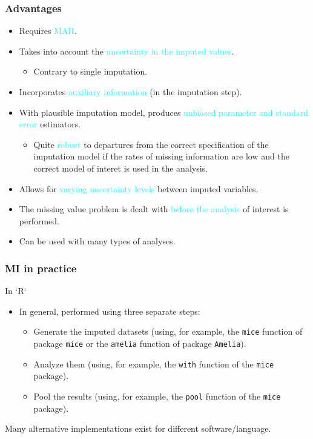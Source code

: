 \documentclass{beamer}
\begin{document}
\begin{frame}
\frametitle{Advantages}

	\begin{itemize}
	\item Requires \textcolor{cyan}{MAR}.%
	\item Takes into account the \textcolor{cyan}{uncertainty in the imputed values}.
			\begin{itemize}
				\item Contrary to single imputation.
			\end{itemize}
	\item Incorporates \textcolor{cyan}{auxiliary information} (in the imputation step).

	\item With plausible imputation model, produces \textcolor{cyan}{unbiased parameter and standard error} estimators. 
		\begin{itemize}
			\item Quite \textcolor{cyan}{robust} to departures from the correct specification of the imputation model if the rates of missing information are low and the correct model of interet is used in the analysis.
		\end{itemize}			
	\item Allows for \textcolor{cyan}{varying uncertainty levels} between imputed variables.
	\item The missing value problem is dealt with \textcolor{cyan}{before the analysis} of interest is performed.
	\item Can be used with many types of analyses.
\end{itemize}
	
	
\end{frame}


\begin{frame}
\frametitle{MI in practice}
In `R`
\begin{itemize}
	\item In general, performed using three separate steps:
		\begin{itemize}
			\item Generate the imputed datasets (using, for example, the \texttt{mice} function of package \texttt{mice} or the \texttt{amelia} function of package \texttt{Amelia}).
			\item Analyze them (using, for example, the \texttt{with} function of the \texttt{mice} package).
			\item Pool the results (using, for example, the \texttt{pool} function of the \texttt{mice} package).
		\end{itemize}
\end{itemize}

Many alternative implementations exist for different software/language.

\end{frame}
\end{document}
